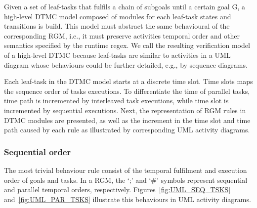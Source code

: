 Given a set of leaf-tasks that fulfils a chain of subgoals until a certain goal G, a high-level DTMC model composed of modules for each leaf-task states and transitions is build. This model must abstract the same behavioural of the corresponding RGM, i.e., it must preserve activities temporal order and other semantics specified by the runtime regex. We call the resulting verification model of a high-level DTMC because leaf-tasks are similar to activities in a UML diagram whose behaviours could be further detailed, e.g., by sequence diagrams. 


Each leaf-task in the DTMC model starts at a discrete time slot. Time slots maps the sequence order of tasks executions. To differentiate the time of parallel tasks, time path is incremented by interleaved task executions, while time slot is incremented by sequential executions. Next, the representation of RGM rules in DTMC modules are presented, as well as the increment in the time slot and time path caused by each rule as illustrated by corresponding UML activity diagrams.



\subsubsection{Sequential order}

The most trivial behaviour rule consist of the temporal fulfilment and execution order of goals and tasks. In a RGM, the `;' and `\#' symbols represent sequential and parallel temporal orders, respectively. Figures~\ref{fig:UML_SEQ_TSKS} and~\ref{fig:UML_PAR_TSKS} illustrate this behaviours in UML activity diagrams.


